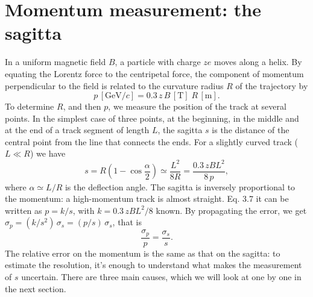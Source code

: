 \documentclass[11pt,a4paper,twoside,openright]{report}
\begin{document}
\section{Momentum measurement: the sagitta}
In a uniform magnetic field $B$, a particle with charge $ze$ moves along a helix. By equating the Lorentz force to the centripetal force, the component of momentum perpendicular to the field is related to the curvature radius $R$ of the trajectory by\cite[Sez.~35.12]{PDG2026}
\begin{equation}
  p\,[\mathrm{GeV}/c] = 0.3\, z\, B\,[\mathrm{T}]\; R\,[\mathrm{m}] .
  \label{eq:pBR}
\end{equation}
To determine $R$, and then $p$, we measure the position of the track
at several points. In the simplest case of three points, at the beginning, in the middle and at the end of a track segment of length $L$, the sagitta $s$ is the distance
of the central point from the line that connects the ends. For a slightly curved track ($L \ll R$) we have
\begin{equation}
  s = R\left(1 - \cos\frac{\alpha}{2}\right) \simeq \frac{L^2}{8R}
  = \frac{0.3\, z B L^2}{8\, p},
  \label{eq:sagitta}
\end{equation}
where $\alpha \simeq L/R$ is the deflection angle. The sagitta is inversely proportional to the momentum: a high-momentum track is almost straight. Eq. 3.7 it can be written as $p = k/s$, with
$k = 0.3\,zBL^2/8$ known. By propagating the error, we get
$\sigma_p = (k/s^2)\,\sigma_s = (p/s)\,\sigma_s$, that is
\begin{equation}
  \frac{\sigma_p}{p} = \frac{\sigma_s}{s} .
  \label{eq:sigmap_sigmas}
\end{equation}
The relative error on the momentum is the same as that on the sagitta: to estimate the resolution, it's enough to understand what makes the measurement of $s$ uncertain. There are three main causes, which we will look at one by one in the next section.
\end{document}
